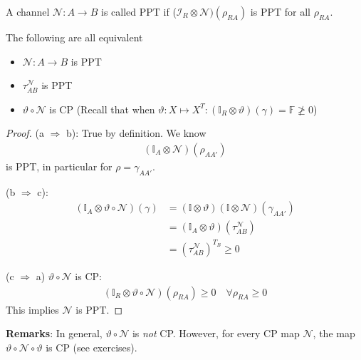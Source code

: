 \documentclass[../../note.tex]{subfiles}
\begin{document}
\begin{definition}
A channel $\mathcal{N}: A \rightarrow B$ is called PPT if ($\mathcal{I}_R \otimes \mathcal{N})(\rho_{RA})$ is PPT for all $\rho_{RA}$.
\end{definition}

\begin{proposition}
The following are all equivalent
\begin{itemize}
    \item $\mathcal{N}: A\rightarrow B$ is PPT
    \item $\tau^{\mathcal{N}}_{AB}$ is PPT 
    \item $\vartheta \circ \mathcal{N}$ is CP (Recall that when $\vartheta: X \mapsto X^T: (\mathbb{I}_R \otimes \vartheta)(\gamma)= \mathbb{F} \ngeq 0$)
\end{itemize}
\end{proposition}

\begin{tcolorbox}[colframe=black,breakable, colback=black!5, arc=0pt, outer arc=0pt,boxrule=0.5pt]
\begin{proof}
(a $\Rightarrow$ b): True by definition. We know
\begin{align}
    (\mathbb{I}_A \otimes \mathcal{N})(\rho_{AA'})
\end{align}
is PPT, in particular for $\rho=\gamma_{AA'}$.

(b $\Rightarrow$ c): \begin{align}
    (\mathbb{I}_A \otimes \vartheta \circ \mathcal{N})(\gamma) &= (\mathbb{I}\otimes \vartheta)(\mathbb{I} \otimes \mathcal{N})(\gamma_{AA'}) \\
    &= (\mathbb{I}_A \otimes \vartheta) (\tau_{AB}^{\mathcal{N}}) \\
    &= (\tau_{AB}^{\mathcal{N}})^{T_B} \geq 0 
\end{align}

(c $\Rightarrow$ a) $\vartheta \circ \mathcal{N}$ is CP: 
\begin{align}
    (\mathbb{I}_R \otimes \vartheta \circ \mathcal{N})(\rho_{RA}) \geq 0 \quad \forall \rho_{RA} \geq 0
\end{align}
This implies $\mathcal{N}$ is PPT.
\end{proof}
\end{tcolorbox}

\textbf{Remarks}: In general, $\vartheta \circ \mathcal{N}$ is \textit{not} CP. However, for every CP map $\mathcal{N}$, the map $\vartheta \circ \mathcal{N} \circ \vartheta$ is CP (see exercises).
\end{document}
